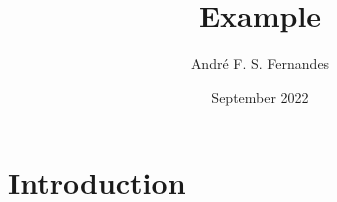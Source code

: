 \documentclass{article}
\title{Example}
\author{André F. S. Fernandes}
\date{September 2022}
\begin{document}
\maketitle

\section{Introduction}
\end{document}
